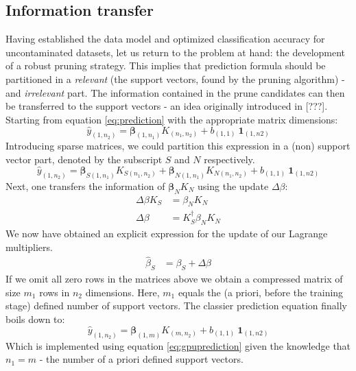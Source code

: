 \documentclass[preprint,12pt]{elsarticle}
\begin{document}
\subsection{Information transfer}
Having established the data model and optimized classification accuracy for uncontaminated datasets, let us return to the problem at hand: the development of a robust pruning strategy. This implies that prediction formula should be partitioned in a \textit{relevant} (the support vectors, found by the pruning algorithm) - and \textit{irrelevant} part. The information contained in the prune candidates can then be transferred to the support vectors - an idea originally introduced in [???]. Starting from equation \ref{eq:prediction} with the appropriate matrix dimensions:
\begin{equation}
\hat{y}_{(1,n_2) } = \mathbf{\beta}_{(1,n_1)} K_{(n_1, n_2)} + b_{(1,1)} \ \mathbf{1}_{(1, n2)} 
\end{equation}
Introducing sparse matrices, we could partition this expression in a (non) support vector part, denoted by the subscript $S$ and $N$ respectively.
\begin{equation}
\hat{y}_{(1,n_2) } = \mathbf{\beta}_{S(1,n_1)} K_{S(n_1, n_2)} + \mathbf{\beta}_{N(1,n_1)} K_{N(n_1, n_2)} + b_{(1,1)} \ \mathbf{1}_{(1, n2)}
\end{equation}
Next, one transfers the information of $\mathbf{\beta}_{N} K_{N}$ using the update $\Delta\beta$: 
\begin{align}
\Delta \beta K_S &= \beta_N K_N  \\
\Delta \beta &= K^\dagger_S  \beta_N K_N
\end{align}
We now have obtained an explicit expression for the update of our Lagrange multipliers. 
\begin{align}
\hat{\beta}_S &= \beta_S + \Delta\beta
\end{align}
If we omit all zero rows in the matrices above we obtain a compressed matrix of size $m_1$ rows in $n_2$ dimensions. Here, $m_1$ equals the (a priori, before the training stage) defined number of support vectors. The classier prediction equation finally boils down to:
\begin{equation}
\hat{y}_{(1,n_2) } = \mathbf{\beta}_{(1,m)} K_{(m, n_2)} + b_{(1,1)} \ \mathbf{1}_{(1, n2)} 
\end{equation}
Which is implemented using equation \ref{eq:gpuprediction} given the knowledge that $n_1 = m$ - the number of a priori defined support vectors. \\
\end{document}
